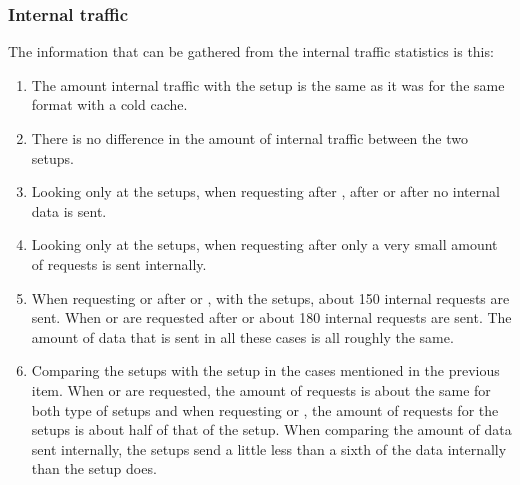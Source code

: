 \documentclass[twoside,openright]{uva-bachelor-thesis}
\begin{document}
\subsubsection{Internal traffic}
The information that can be gathered from the internal traffic statistics is
this:
\begin{enumerate}
    \item
        The amount internal traffic with the \cdn setup is the same as it was
        for the same format with a cold cache.

    \item
        There is no difference in the amount of internal traffic between the
        two \lt setups.

    \item
        Looking only at the \lt setups, when requesting \dash after \iss, \iss
        after \dash or \hds after \hls no internal data is sent.

    \item Looking only at the \lt setups, when requesting \hls after \hds only a
        very small amount of requests is sent internally.

    \item When requesting \hds or \hls after \dash or \iss, with the \lt setups,
        about 150 internal requests are sent. When \dash or \iss are requested
        after \hds or \hls about 180 internal requests are sent.  The amount of
        data that is sent in all these cases is all roughly the same.

    \item
        Comparing the \lt setups with the \cdn setup in the cases mentioned in
        the previous item. When \hds or \hls are requested, the amount of
        requests is about the same for both type of setups and when requesting
        \dash or \iss, the amount of requests for the \lt setups is about half
        of that of the \cdn setup. When comparing the amount of data sent
        internally, the \lt setups send a little less than a sixth of the data
        internally than the \cdn setup does.

\end{enumerate}






\FloatBarrier
\end{document}
